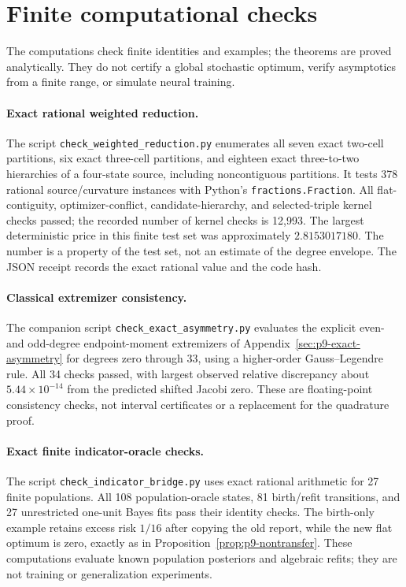 \section{Finite computational checks}
\label{sec:computations}
The computations check finite identities and examples; the theorems are
proved analytically. They do not certify a global stochastic optimum,
verify asymptotics from a finite range, or simulate neural training.

\paragraph{Exact rational weighted reduction.}
The script \texttt{check\_weighted\_reduction.py} enumerates all seven exact
two-cell partitions, six exact three-cell partitions, and eighteen exact
three-to-two hierarchies of a four-state source, including noncontiguous
partitions. It tests 378 rational source/curvature instances with Python's
\texttt{fractions.Fraction}. All flat-contiguity, optimizer-conflict,
candidate-hierarchy, and selected-triple kernel checks passed; the recorded
number of kernel checks is 12,993. The largest deterministic price in this
finite test set was approximately $2.8153017180$. The number is a property
of the test set, not an estimate of the degree envelope. The JSON receipt
records the exact rational value and the code hash.

\paragraph{Classical extremizer consistency.}
The companion script \texttt{check\_exact\_asymmetry.py} evaluates the
explicit even- and odd-degree endpoint-moment extremizers of
Appendix~\ref{sec:p9-exact-asymmetry} for degrees zero through 33,
using a higher-order Gauss--Legendre rule. All 34 checks passed, with
largest observed relative discrepancy about $5.44\times10^{-14}$ from
the predicted shifted Jacobi zero. These are floating-point consistency
checks, not interval certificates or a replacement for the quadrature
proof.



\paragraph{Exact finite indicator-oracle checks.}
The script \texttt{check\_indicator\_bridge.py} uses exact rational
arithmetic for 27 finite populations. All 108 population-oracle states,
81 birth/refit transitions, and 27 unrestricted one-unit Bayes fits pass
their identity checks. The birth-only example retains excess risk $1/16$
after copying the old report, while the new flat optimum is zero, exactly
as in Proposition~\ref{prop:p9-nontransfer}. These computations evaluate
known population posteriors and algebraic refits; they are not training
or generalization experiments.

